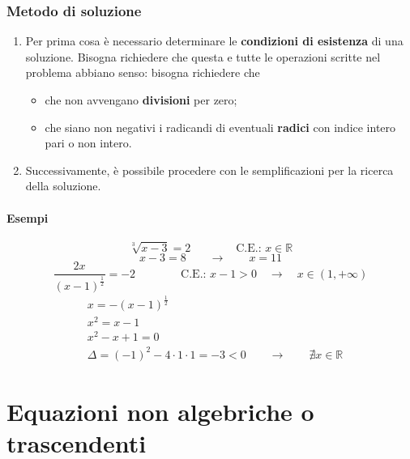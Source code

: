 \subsubsection{Metodo di soluzione}
\begin{enumerate}
    \item Per prima cosa è necessario determinare le \textbf{condizioni di esistenza} di una soluzione. Bisogna richiedere che questa e tutte le operazioni scritte nel problema abbiano senso: bisogna richiedere che
        \begin{itemize}
            \item che non avvengano \textbf{divisioni} per zero;
            \item che siano non negativi i radicandi di eventuali \textbf{radici} con indice intero pari o non intero.
        \end{itemize}
    \item Successivamente, è possibile procedere con le semplificazioni per la ricerca della soluzione.
\end{enumerate}

\paragraph{Esempi}
\begin{equation}
    \sqrt[3]{x-3} = 2 \qquad \qquad \text{C.E.: } x \in \mathbb{R}
\end{equation}
\begin{equation}
    x-3 = 8 \qquad \rightarrow \qquad x = 11
\end{equation}
\begin{equation}
    \dfrac{2 x}{(x-1)^{\frac{1}{2}}} = - 2 \qquad \qquad \text{C.E.: } x-1>0 \quad \rightarrow \quad x \in (1,+\infty)
\end{equation}
\begin{equation}
\begin{aligned}
    &  x = -  (x-1)^{\frac{1}{2}} \\
    &  x^2 =   x-1  \\
    & x^2 - x + 1 = 0 \\
    & \Delta = (-1)^2 - 4 \cdot 1 \cdot 1 = -3 < 0 \qquad \rightarrow \qquad \nexists x \in \mathbb{R}
\end{aligned}
\end{equation}

\section{Equazioni non algebriche o trascendenti}
